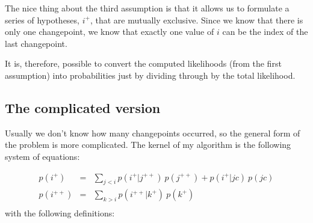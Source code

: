 \documentclass[twocolumn,11pt]{article}
\begin{document}
The nice thing about the third assumption is that it allows
us to formulate a series of hypotheses, $i^+$, that are mutually
exclusive.  Since we know that there is only one changepoint, we
know that exactly one value of $i$ can be the index of the
last changepoint.

It is, therefore, possible to convert the computed likelihoods
(from the first assumption) into probabilities just by dividing
through by the total likelihood.


\subsection{The complicated version}

Usually we don't know how many changepoints occurred, so the
general form of the problem is more complicated.  The kernel
of my algorithm is the following system of equations:

\newcommand{\p}{\ p}

\begin{eqnarray*}
p(i^+) &=& \sum_{j<i} p(i^+ | j^{++}) \p(j^{++}) + p(i^+ | jc) \p(jc)   \\
p(i^{++}) &=& \sum_{k>i} p(i^{++} | k^+) \p(k^+) \\
\end{eqnarray*}
%
with the following definitions:
\end{document}
